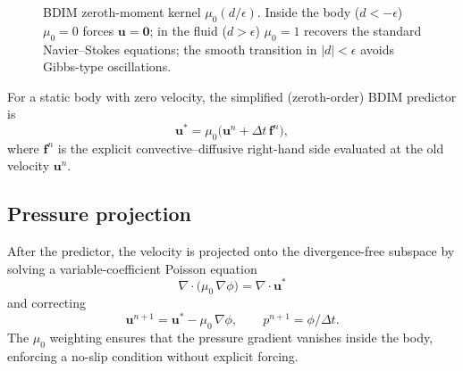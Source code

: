 \documentclass[11pt]{article}
\newcommand{\vect}[1]{\bm{#1}}
\begin{document}
\begin{figure}[ht]
\centering
{}
\caption{BDIM zeroth-moment kernel $\mu_0(d/\epsilon)$.
  Inside the body ($d<-\epsilon$) $\mu_0=0$ forces $\vect{u}=\vect{0}$;
  in the fluid ($d>\epsilon$) $\mu_0=1$ recovers the standard
  Navier--Stokes equations; the smooth transition in
  $|d|<\epsilon$ avoids Gibbs-type oscillations.}
\label{fig:mu0}
\end{figure}

For a static body with zero velocity, the simplified (zeroth-order) BDIM
predictor is
\begin{equation}\label{eq:bdim_pred}
  \vect{u}^{*} = \mu_0\bigl(\vect{u}^{n} + \Delta t\,\vect{f}^{n}\bigr),
\end{equation}
where $\vect{f}^{n}$ is the explicit convective--diffusive right-hand side
evaluated at the old velocity $\vect{u}^{n}$.

\subsection{Pressure projection}

After the predictor, the velocity is projected onto the divergence-free
subspace by solving a variable-coefficient Poisson equation
\begin{equation}\label{eq:poisson}
  \nabla\cdot\bigl(\mu_0\,\nabla\phi\bigr) = \nabla\cdot\vect{u}^{*}
\end{equation}
and correcting
\begin{equation}\label{eq:proj}
  \vect{u}^{n+1} = \vect{u}^{*} - \mu_0\,\nabla\phi,
  \qquad
  p^{n+1} = \phi/\Delta t.
\end{equation}
The $\mu_0$ weighting ensures that the pressure gradient vanishes inside
the body, enforcing a no-slip condition without explicit forcing.
\end{document}
